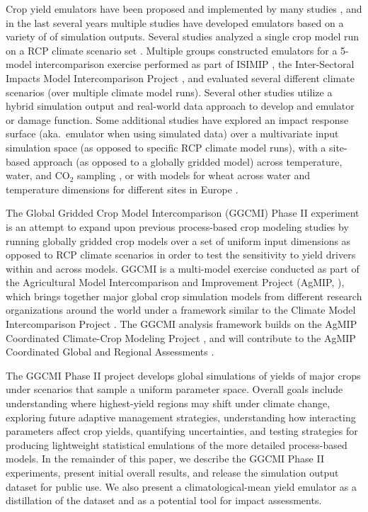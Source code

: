 \documentclass[preprint, 5p, times, twocolumn]{elsarticle}
\begin{document}
Crop yield emulators have been proposed and implemented by many studies \citep[e.g.\ ][]{Howden2005, raisen2006, Lobell2010, Iizumi2010, Ferrise2011, Holzkamper2012, RUANE2013a, Howden2005, Markowski2015}, and in the last several years multiple studies have developed emulators based on a variety of of simulation outputs. Several studies analyzed a single crop model run on a RCP climate scenario set \citep[e.g.\ ][]{Oyebamiji15}. Multiple groups constructed emulators for a 5-model intercomparison exercise performed as part of ISIMIP \citep{Warszawski3228}, the Inter-Sectoral Impacts Model Intercomparison Project \citep[e.g.\ ][]{BLANC2015, BLANC2017, Ostberg2018}, and evaluated several different climate scenarios (over multiple climate model runs). Several other studies \citep[e.g.\ ][]{Moore2017, Mistry2017} utilize a hybrid simulation output and real-world data approach to develop and emulator or damage function. Some additional studies have explored an impact response surface (aka.\ emulator when using simulated data) over a multivariate input simulation space (as opposed to specific RCP climate model runs), with a site-based approach (as opposed to a globally gridded model) across temperature, water, and CO$_2$ sampling \citep{snyder2018}, or with models for wheat across water and temperature dimensions for different sites in Europe \citep{FRONZEK20182}. 

The Global Gridded Crop Model Intercomparison (GGCMI) Phase II experiment is an attempt to expand upon previous process-based crop modeling studies by running globally gridded crop models over a set of uniform input dimensions as opposed to RCP climate scenarios in order to test the sensitivity to yield drivers within and across models. GGCMI is a multi-model exercise conducted as part of the Agricultural Model Intercomparison and Improvement Project (AgMIP, \citep{ROSENZWEIG2013, Rosenzweig2014}), which brings together major global crop simulation models from different research organizations around the world under a framework similar to the Climate Model Intercomparison Project \citep[CMIP,~][]{Taylor2012, Eyring2016}. The GGCMI analysis framework builds on the AgMIP Coordinated Climate-Crop Modeling Project \citep[C3MP,~][]{ruane2014, mcdermid2015}, and will contribute to the AgMIP Coordinated Global and Regional Assessments \citep[CGRA,~][]{ruane2018, rosenzweig2018}. 

The GGCMI Phase II project develops global simulations of yields of major crops under scenarios that sample a uniform parameter space. Overall goals include understanding where highest-yield regions may shift under climate change, exploring future adaptive management strategies, understanding how interacting parameters affect crop yields, quantifying uncertainties, and testing strategies for producing lightweight statistical emulations of the more detailed process-based models. In the remainder of this paper, we describe the GGCMI Phase II experiments, present initial overall results, and release the simulation output dataset for public use. We also present a climatological-mean yield emulator as a distillation of the dataset and as a potential tool for impact assessments.
\end{document}
